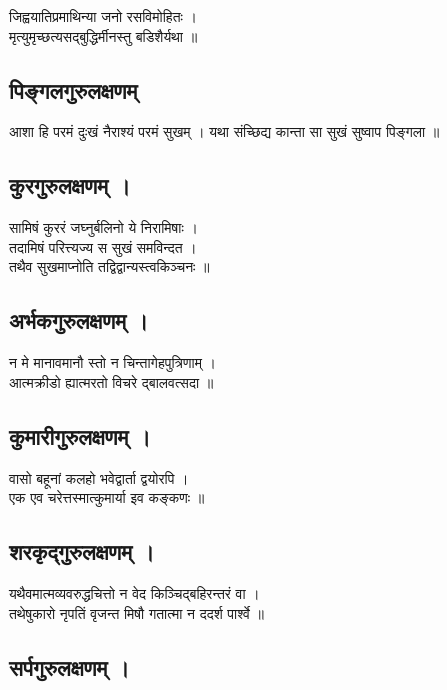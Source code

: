 जिह्वयातिप्रमाथिन्या जनो रसविमोहितः ।\\[-2mm]
मृत्युमृच्छत्यसद्बुद्धिर्मीनस्तु बडिशैर्यथा ॥\\

\subsection{पिङ्गलगुरुलक्षणम्}

आशा हि परमं दुःखं नैराश्यं परमं सुखम् । 
यथा संच्छिद्य कान्ता सा सुखं सुष्वाप पिङ्गला ॥\\

\subsection{कुरगुरुलक्षणम् ।}

सामिषं कुररं जघ्नुर्बलिनो ये निरामिषाः ।\\[-2mm]
तदामिषं परित्त्यज्य स सुखं समविन्दत ।\\[-2mm]
तथैव सुखमाप्नोति तद्विद्वान्यस्त्वकिञ्चनः ॥\\

\subsection{अर्भकगुरुलक्षणम् ।}
 
न मे मानावमानौ स्तो न चिन्तागेहपुत्रिणाम् ।\\[-2mm]
आत्मक्रीडो ह्यात्मरतो विचरे द्बालवत्सदा ॥\\

\subsection{कुमारीगुरुलक्षणम् ।}

वासो बहूनां कलहो भवेद्वार्ता द्वयोरपि ।\\[-2mm]
एक एव चरेत्तस्मात्कुमार्या इव कङ्कणः ॥\\

\subsection{शरकृद्गुरुलक्षणम् ।}

यथैवमात्मव्यवरुद्धचित्तो 
न वेद किञ्चिद्बहिरन्तरं वा ।\\[-2mm]
तथेषुकारो नृपतिं वृजन्त
मिषौ गतात्मा न ददर्श पार्श्वे ॥\\

\subsection{सर्पगुरुलक्षणम् ।}


